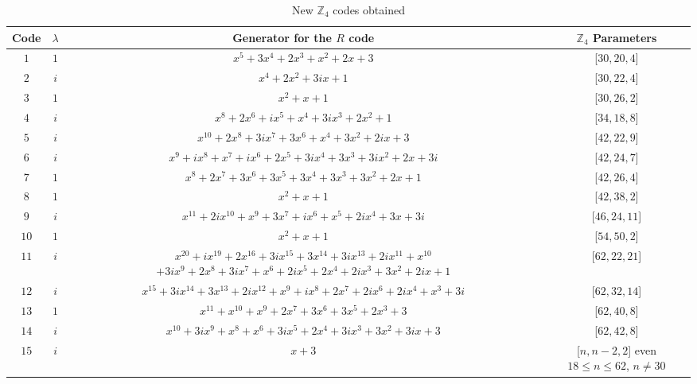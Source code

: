 \documentclass[a4paper, 12pt]{amsart}
\theoremstyle{definition}
\newcommand{\Z}{{\mathbb Z}}
\numberwithin{equation}{section}
\numberwithin{table}{section}
\begin{document}
\begin{table}[htbp]
    \centering
    \caption{New $\Z_4$ codes obtained}
    \label{findings}
    \renewcommand{\arraystretch}{1.2}
    \begin{adjustbox}{center}
    \hspace{-12mm}
    \begin{tabular}{|c|c|c|c|} %
    \hline
    \textbf{Code} & \textbf{$\lambda$} & \textbf{Generator for the $R$ code} & \textbf{$\Z_4$ Parameters} \\ \hline
     $1$ & $1$ & $x^5 + 3x^4 + 2x^3 + x^2 + 2x + 3$ & [$30,20,4$]\\ \hline %
    $2$ & $i$ & $x^4 + 2x^2 + 3ix + 1$ &  [$30,22,4$] \\ \hline
    $3$ & $1$ & $x^2 + x + 1$ & [$30,26,2$] \\ \hline
    $4$ & $i$ & $x^8 +2x^6 +ix^5 +x^4 +3ix^3 +2x^2 +1$  & [$34,18,8$] \\ \hline
    $5$ & $i$ & $x^{10} + 2x^8 + 3ix^7 + 3x^6 + x^4 + 3x^2 + 2ix + 3$  & [$42,22,9$]\\ \hline
    $6$ & $i$ & $x^9 + ix^8 + x^7 + ix^6 + 2x^5 + 3ix^4 + 3x^3 + 3ix^2 + 2x + 3i$ & [$42,24,7$] \\ \hline
    $7$ & $1$ & $x^8 + 2x^7 + 3x^6 + 3x^5 + 3x^4 + 3x^3 + 3x^2 + 2x + 1$ & [$42,26,4$] \\ \hline %
    $8$ & $1$ & $x^2 + x + 1$ & [$42,38,2$] \\ \hline
    $9$ & $i$ & $x^{11} + 2ix^{10} + x^9 + 3x^7 + ix^6 + x^5 + 2ix^4 + 3x + 3i$ &  [$46,24,11$] \\ \hline
    $10$ & $1$ & $x^2+x+1$ & [$54,50,2$] \\ \hline
    $11$ & $i$ & \makecell[c]{$x^{20} + ix^{19} + 2x^{16} + 3ix^{15} + 3x^{14} + 3ix^{13} + 2ix^{11}+ x^{10}$ \\
    $+ 3ix^9 + 2x^8 + 3ix^7 + x^6 + 2ix^5 + 2x^4 + 2ix^3 + 3x^2 + 2ix + 1$}  & [$62,22,21$] \\ \hline
    $12$ & $i$ & $x^{15} + 3ix^{14} + 3x^{13} + 2ix^{12} + x^9 + ix^8 + 2x^7 + 2ix^6 + 2ix^4 + x^3 + 3i$ &  [$62,32,14$] \\ \hline
    $13$ & $1$ & $x^{11} + x^{10} + x^9 + 2x^7 + 3x^6 + 3x^5 + 2x^3 + 3$ & [$62,40,8$] \\ \hline
    $14$ & $i$ & $x^{10} + 3ix^9 + x^8 + x^6 + 3ix^5 + 2x^4 + 3ix^3 + 3x^2 + 3ix + 3$ &  [$62,42,8$] \\ \hline
    $15$ & $i$ & $x+3$ & \makecell[c]{[$n,n-2,2$] \\
    even $18 \leq n \leq 62$, \\ $n \neq 30$} \\ \hline
    \end{tabular}
    \end{adjustbox}
    
\end{table}
\end{document}
